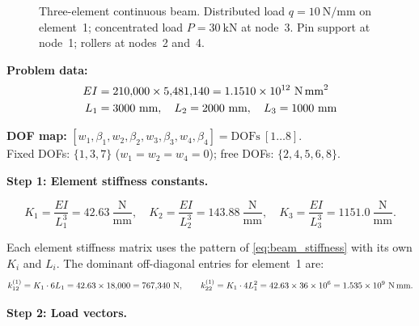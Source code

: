 \begin{example}
\begin{figure}[htbp]
\caption{Three-element continuous beam. Distributed load
$q = 10\ \text{N/mm}$ on element~1; concentrated load
$P = 30\ \text{kN}$ at node~3. Pin support at node~1;
rollers at nodes~2 and~4.}
\label{fig:beam_continuous}
\end{figure}

\noindent\textbf{Problem data:}
\begin{align*}
    EI &= 210{,}000 \times 5{,}481{,}140 = 1.1510 \times 10^{12}\ \text{N\,mm}^2 \\
    L_1 &= 3000\ \text{mm},\quad L_2 = 2000\ \text{mm},\quad L_3 = 1000\ \text{mm}
\end{align*}

\noindent\textbf{DOF map:}
$[w_1,\beta_1,w_2,\beta_2,w_3,\beta_3,w_4,\beta_4] = \text{DOFs}\ [1\ldots8]$.\\
Fixed DOFs: $\{1,3,7\}$ ($w_1=w_2=w_4=0$); free DOFs: $\{2,4,5,6,8\}$.

\medskip
\noindent\textbf{Step 1: Element stiffness constants.}

\begin{equation*}
    K_1 = \frac{EI}{L_1^3} = 42.63\ \frac{\text{N}}{\text{mm}}, \quad
    K_2 = \frac{EI}{L_2^3} = 143.88\ \frac{\text{N}}{\text{mm}}, \quad
    K_3 = \frac{EI}{L_3^3} = 1151.0\ \frac{\text{N}}{\text{mm}} .
\end{equation*}

Each element stiffness matrix uses the pattern of \cref{eq:beam_stiffness}
with its own $K_i$ and $L_i$. The dominant off-diagonal entries for
element~1 are:
\[
    k^{(1)}_{12} = K_1 \cdot 6L_1 = 42.63 \times 18{,}000 = 767{,}340\ \text{N} ,
    \qquad
    k^{(1)}_{22} = K_1 \cdot 4L_1^2 = 42.63 \times 36 \times 10^6
                 = 1.535 \times 10^9\ \text{N\,mm} .
\]

\medskip
\noindent\textbf{Step 2: Load vectors.}


\end{example}
